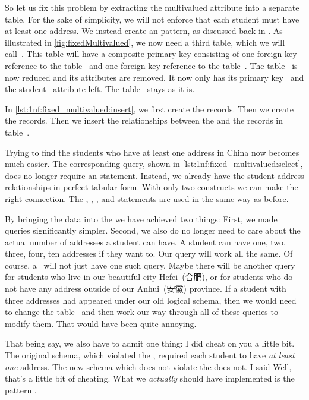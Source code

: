 So let us fix this problem by extracting the multivalued attribute into a separate table.
For the sake of simplicity, we will not enforce that each student must have at least one address.
We instead create an  pattern, as discussed back in .
As illustrated in \cref{fig:fixedMultivalued}, we now need a third table, which we will call~.
This table will have a composite primary key consisting of one foreign key reference to the table~ and one foreign key reference to the table~.
The table~ is now reduced and its  attributes are removed.
It now only has its primary key~ and the student~ attribute left.
The table~ stays as it is.

In \cref{lst:1nf:fixed_multivalued:insert}, we first create the  records.
Then we create the  records.
Then we insert the relationships between the  and the  records in table~.

Trying to find the students who have at least one address in China now becomes much easier.
The corresponding query, shown in \cref{lst:1nf:fixed_multivalued:select}, does no longer require an  statement.
Instead, we already have the student-address relationships in perfect tabular form.
With only two  constructs we can make the right connection.
The , , , and  statements are used in the same way as before.

By bringing the data into the  we have achieved two things:
First, we made queries significantly simpler.
Second, we also do no longer need to care about the actual number of addresses a student can have.
A student can have one, two, three, four, ten addresses if they want to.
Our query will work all the same.
Of course, a \db\ will not just have one such query.
Maybe there will be another query for students who live in our beautiful city Hefei~(合肥), or for students who do not have any address outside of our Anhui~(安徽) province.
If a student with three addresses had appeared under our old logical schema, then we would need to change the table~ and then work our way through all of these queries to modify them.
That would have been quite annoying.

That being say, we also have to admit one thing:
I did cheat on you a little bit.
The original schema, which violated the , required each student to have \emph{at least one} address.
The new schema which does not violate the  does not.
I said \emph{}
Well, that's a little bit of cheating.
What we \emph{actually} should have implemented is the pattern .

